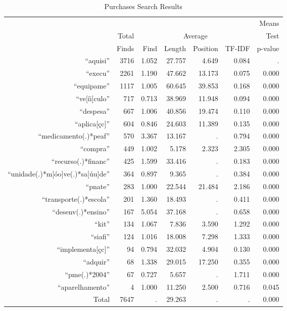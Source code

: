 \begin{table}[!htbp]
  \caption{\label{tab:purchasesresults} Purchases Search Results}
  \centering
  \footnotesize
  \begin{tabular}{rrrrrrr}
  \hline

  \hline
  \multicolumn{6}{c}{} & Means \T \B \\
  & Total & \multicolumn{4}{c}{Average} & Test \T \B \\ \cline{3-6}
  & Finds & Find & Length & Position & TF-IDF & p-value \T \B \\
  \hline
  ``aquisi'' & 3716 & 1.052 & 27.757 & 4.649 & 0.084 & . \T \B \\
  ``execu'' & 2261 & 1.190 & 47.662 & 13.173 & 0.075 & 0.000 \T \B \\
  ``equipame'' & 1117 & 1.005 & 60.645 & 39.853 & 0.168 & 0.000 \T \B \\
  ``ve{[}íi{]}culo'' & 717 & 0.713 & 38.969 & 11.948 & 0.094 & 0.000 \T \B \\
  ``despesa'' & 667 & 1.006 & 40.856 & 19.474 & 0.110 & 0.000 \T \B \\
  ``aplica{[}çc{]}'' & 604 & 0.846 & 24.603 & 11.389 & 0.135 & 0.000 \T \B \\
  ``medicamento(.)*peaf'' & 570 & 3.367 & 13.167 & . & 0.794 & 0.000 \T \B \\
  ``compra'' & 449 & 1.002 & 5.178 & 2.323 & 2.305 & 0.000 \T \B \\
  ``recurso(.)*financ'' & 425 & 1.599 & 33.416 & . & 0.183 & 0.000 \T \B \\
  ``unidade(.)*m{[}óo{]}ve(.)*sa{[}úu{]}de'' & 364 & 0.897 & 9.365 & . & 0.384 & 0.000 \T \B \\
  ``pnate'' & 283 & 1.000 & 22.544 & 21.484 & 2.186 & 0.000 \T \B \\
  ``transporte(.)*escola'' & 201 & 1.360 & 18.493 & . & 0.411 & 0.000 \T \B \\
  ``desenv(.)*ensino'' & 167 & 5.054 & 37.168 & . & 0.658 & 0.000 \T \B \\
  ``kit'' & 134 & 1.067 & 7.836 & 3.590 & 1.292 & 0.000 \T \B \\
  ``siafi'' & 124 & 1.016 & 18.008 & 7.298 & 1.333 & 0.000 \T \B \\
  ``implementa{[}çc{]}'' & 94 & 0.794 & 32.032 & 4.904 & 0.130 & 0.000 \T \B \\
  ``adquir'' & 68 & 1.338 & 29.015 & 17.250 & 0.355 & 0.000 \T \B \\
  ``pme(.)*2004'' & 67 & 0.727 & 5.657 & . & 1.711 & 0.000 \T \B \\
  ``aparelhamento'' & 4 & 1.000 & 11.250 & 2.500 & 0.716 & 0.045 \T \B \\ \hline
   Total & 7647 & . & 29.263 & . & . & 0.000 \T \B \\
  \hline

  \hline
  \end{tabular}
\end{table}
